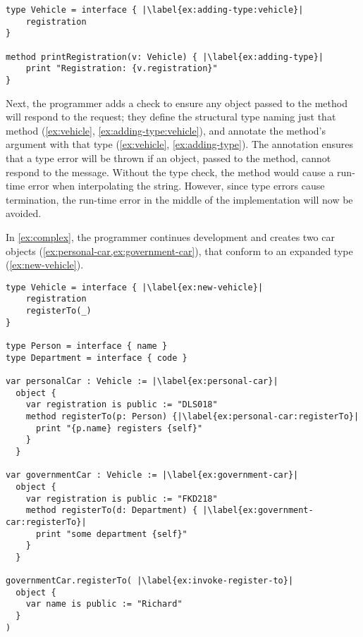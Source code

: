 \begin{lstlisting}[label={ex:vehicle},caption={Adding a type annotation to a method parameter.},escapechar=|,columns=flexible,float,floatplacement=H]
type Vehicle = interface { |\label{ex:adding-type:vehicle}|
    registration    
}

method printRegistration(v: Vehicle) { |\label{ex:adding-type}|
    print "Registration: {v.registration}"
}
\end{lstlisting}

Next, the programmer adds a check to ensure any object passed to the
 method will respond to the
 request; 
they define the structural type \citep{theCleanVehicle}
naming just that method (\cref{ex:vehicle}, \cref{ex:adding-type:vehicle}), 
and annotate the  method's
argument with that type (\cref{ex:vehicle}, \cref{ex:adding-type}).
The annotation ensures that a type error will be thrown if an object,
passed to the  method,
cannot respond to the  message.
Without the type check, the  method would
cause a run-time error when interpolating the string.
However, since type errors cause termination, 
the run-time error in the middle of the
 implementation
will now be avoided.

In \cref{ex:complex}, 
the programmer continues development and creates two car objects 
(\cref{ex:personal-car,ex:government-car}),
that conform to an expanded  type (\cref{ex:new-vehicle}).


\begin{lstlisting}[caption={A program in development with inconsistently
    typed \code{registerTo} methods.},escapechar=|,label={ex:complex},float,floatplacement=htb,columns=flexible,float,floatplacement=H]
type Vehicle = interface { |\label{ex:new-vehicle}|
    registration
    registerTo(_)
}

type Person = interface { name }
type Department = interface { code }

var personalCar : Vehicle := |\label{ex:personal-car}|
  object {
    var registration is public := "DLS018"
    method registerTo(p: Person) {|\label{ex:personal-car:registerTo}|
      print "{p.name} registers {self}"
    } 
  }

var governmentCar : Vehicle := |\label{ex:government-car}|
  object {
    var registration is public := "FKD218"
    method registerTo(d: Department) { |\label{ex:government-car:registerTo}|
      print "some department {self}"
    }
  }

governmentCar.registerTo( |\label{ex:invoke-register-to}|
  object {
    var name is public := "Richard"
  }
)
\end{lstlisting}


